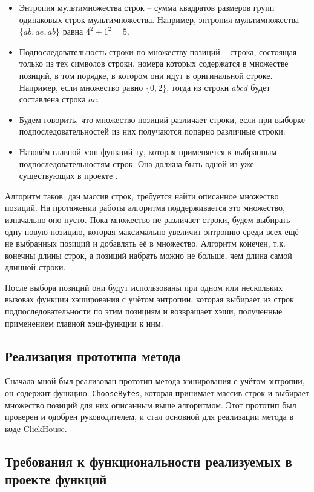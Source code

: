 \documentclass[a4paper,12pt]{extarticle}
\begin{document}
\begin{sloppypar}
\begin{itemize}
	\item Энтропия мультимножества строк -- сумма квадратов размеров групп одинаковых строк мультимножества. Например, энтропия мультимножества $\{ab, ae, ab\}$ равна $4^2+1^2 = 5$.
	\item Подпоследовательность строки по множеству позиций -- строка, состоящая только из тех символов строки, номера которых содержатся в множестве позиций, в том порядке, в котором они идут в оригинальной строке. Например, если множество равно $\{0, 2\}$, тогда из строки $abcd$ будет составлена строка $ac$.
	\item Будем говорить, что множество позиций различает строки, если при выборке подпоследовательностей из них получаются попарно различные строки.
	\item Назовём главной хэш-функций ту, которая применяется к выбранным подпоследовательностям строк. Она должна быть одной из уже существующих в проекте \cite{clickhouse_hash_functions}.
\end{itemize}

Алгоритм таков: дан массив строк, требуется найти описанное множество позиций. На протяжении работы алгоритма поддерживается это множество, изначально оно пусто. Пока множество не различает строки, будем выбирать одну новую позицию, которая максимально увеличит энтропию среди всех ещё не выбранных позиций и добавлять её в множество. Алгоритм конечен, т.к. конечны длины строк, а позиций набрать можно не больше, чем длина самой длинной строки.

После выбора позиций они будут использованы при одном или нескольких вызовах функции хэширования с учётом энтропии, которая выбирает из строк подпоследовательности по этим позициям и возвращает хэши, полученные применением главной хэш-функции к ним.  

\subsection{Реализация прототипа метода}

Сначала мной был реализован прототип метода хэширования с учётом энтропии, он содержит функцию: \texttt{ChooseBytes}, которая принимает массив строк и выбирает множество позиций для них описанным выше алгоритмом. Этот прототип был проверен и одобрен руководителем, и стал основной для реализации метода в коде ClickHouse.

\subsection{Требования к функциональности реализуемых в проекте функций}


\end{sloppypar}
\end{document}
